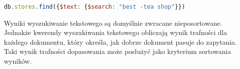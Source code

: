 \begin{lstlisting}[language=JavaScript,
caption={Zapytanie wykluczające wyraz \enquote{tea}},
label={lst:mongoExampleExcludeSearch}]
db.stores.find({$text: {$search: "best -tea shop"}})
\end{lstlisting}

Wyniki wyszukiwanie tekstowego są domyślnie zwracane nieposortowane. 
Jednakże kwerendy wyszukiwania tekstowego obliczają wynik trafności dla każdego dokumentu, który określa, jak dobrze dokument pasuje do zapytania.
Taki wynik trafności dopasowania może posłużyć jako kryterium sortowania wyników.


